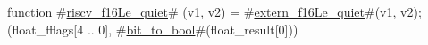 function #\hyperref[sailRISCVzriscvzyf16Lezyquiet]{riscv\_f16Le\_quiet}# (v1, v2) = {
  #\hyperref[sailRISCVzexternzyf16Lezyquiet]{extern\_f16Le\_quiet}#(v1, v2);
  (float_fflags[4 .. 0], #\hyperref[sailRISCVzbitzytozybool]{bit\_to\_bool}#(float_result[0]))
}
